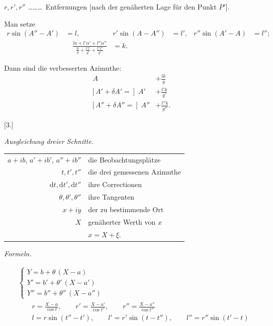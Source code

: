 \documentclass[12pt,a4paper]{article}
\theoremstyle{plain}
\theoremstyle{definition}
\theoremstyle{remark}
\begin{document}
$r, r', r''$ \ldots\ldots\ldots\ Entfernungen [nach der genäherten Lage für den Punkt $P'$].

Man setze
\begin{align*}
r \sin(A'' - A') &= l, & r' \sin(A - A'') &= l', & r'' \sin(A' - A) &= l''; \\
&\quad \frac{la + l'\alpha' + l''\alpha''}{\frac{ll}{g} + \frac{l'l'}{g'} + \frac{l''l''}{g''}} &= k.
\end{align*}

Dann sind die verbesserten Azimuthe:
\begin{align*}
[A + \delta A =]\; A &+ \frac{lk}{g} \\
[A' + \delta A' =]\; A' &+ \frac{l'k}{g'} \\
[A'' + \delta A'' =]\; A'' &+ \frac{l''k}{g''}.
\end{align*}

\medskip
\begin{center}
[3.]

\emph{Ausgleichung dreier Schnitte.}
\end{center}

\begin{tabular}{r@{\ldots\ldots\ldots\ }l}
$a + ib$, $a' + ib'$, $a'' + ib''$ & die Beobachtungsplätze \\
$t, t', t''$ & die drei gemessenen Azimuthe \\
$\mathrm{d}t, \mathrm{d}t', \mathrm{d}t''$ & ihre Correctionen \\
$\theta, \theta', \theta''$ & ihre Tangenten \\
$x + iy$ & der zu bestimmende Ort \\
$X$ & genäherter Werth von $x$ \\
& $x = X + \xi$.
\end{tabular}

\begin{center}
\emph{Formeln.}
\end{center}
\begin{align}
&\left\{\begin{array}{l}
Y = b + \theta\,(X - a) \\
Y' = b' + \theta'\,(X - a') \\
Y'' = b'' + \theta''\,(X - a'')
\end{array}\right. \\
&\qquad r = \frac{X - a}{\cos t}, \qquad r' = \frac{X - a'}{\cos t'}, \qquad r'' = \frac{X - a''}{\cos t''} \\
&\qquad l = r \sin(t'' - t'), \qquad l' = r' \sin(t - t''), \qquad l'' = r'' \sin(t' - t)
\end{align}
\end{document}
